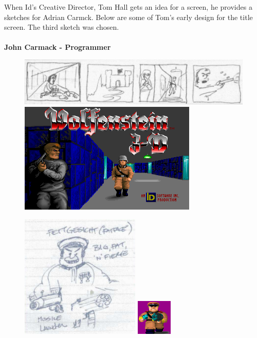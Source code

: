\documentclass[book.tex]{subfiles}
\begin{document}
 \begin{fancyquotes}
When Id's Creative Director, Tom Hall gets an idea for a screen, he provides a sketches for Adrian Carmck. Below are some of Tom's early design for the title screen. The third sketch was chosen.\\
\\
\textbf{John Carmack - Programmer}
\end{fancyquotes}

   \begin{figure}[H]
\centering
 \includegraphics[scale=0.5]{imgs/tom_hall_sketch_intro_screen_genesis.png}
 \par
 \includegraphics[scale=2]{imgs/sprites/woldf3d.png}
 \end{figure}
 
   \begin{figure}[H]
\centering
 \includegraphics[scale=1]{imgs/tom_hall_sketch_officer.png}
\includegraphics[scale=9]{imgs/sprites/fettgesic.png}
 \end{figure}
 
\end{document}
